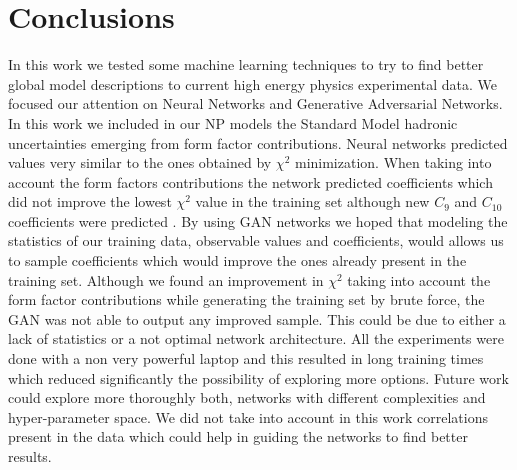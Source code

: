 \documentclass[a4paper,fleqn]{cas-dc}
\begin{document}
\section{Conclusions}
In this work we tested some machine learning techniques to try to find better global model descriptions to current high energy physics experimental data. We focused our attention on Neural Networks and Generative Adversarial Networks.  In this work we included in our NP models the Standard Model hadronic uncertainties emerging from form factor contributions.  Neural networks predicted values very similar to the ones obtained by \(\chi^2 \) minimization. When taking into account the form factors contributions the network predicted coefficients which did not improve the lowest \(\chi^2 \) value in the training set although new \(C_9\) and \(C_{10}\) coefficients were predicted . By using GAN networks we hoped that modeling the statistics of our training data, observable values and coefficients, would allows us to sample coefficients which would improve the ones already present in the training set. Although we found an improvement in \(\chi^2 \) taking into account the form factor contributions while generating the training set by brute force, the GAN was not able to output any improved sample. This could be due to either a lack of statistics or a not optimal network architecture. All the experiments were done with a non very powerful laptop and this resulted in long training times which reduced significantly the possibility of exploring more options. Future work could explore more thoroughly both, networks with different complexities and hyper-parameter space. We did not take into account in this work correlations present in the data which could help in guiding the networks to find better results.





\printcredits

%





\end{document}
